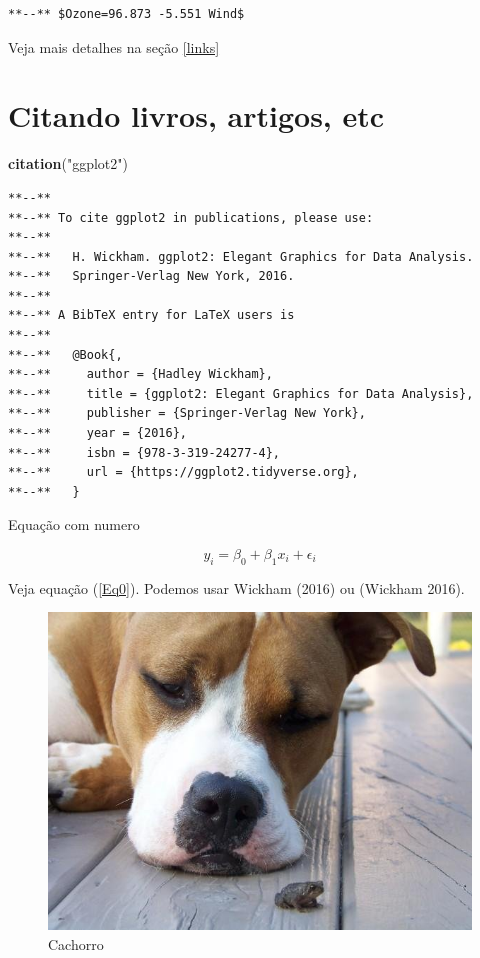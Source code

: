 \documentclass[12pt,brazil,]{article}
\newenvironment{Shaded}{\begin{snugshade}}{\end{snugshade}}
\newcommand{\KeywordTok}[1]{\textcolor[rgb]{0.26,0.66,0.93}{\textbf{#1}}}
\newcommand{\NormalTok}[1]{\textcolor[rgb]{0.74,0.68,0.62}{#1}}
\newcommand{\StringTok}[1]{\textcolor[rgb]{0.02,0.61,0.04}{#1}}
\begin{document}
\begin{verbatim}
**--** $Ozone=96.873 -5.551 Wind$
\end{verbatim}

Veja mais detalhes na seção \ref{links}

\hypertarget{citando-livros-artigos-etc}{%
\section{Citando livros, artigos,
etc}\label{citando-livros-artigos-etc}}

\begin{Shaded}
\begin{Highlighting}[]
\KeywordTok{citation}\NormalTok{(}\StringTok{"ggplot2"}\NormalTok{)}
\end{Highlighting}
\end{Shaded}

\begin{verbatim}
**--** 
**--** To cite ggplot2 in publications, please use:
**--** 
**--**   H. Wickham. ggplot2: Elegant Graphics for Data Analysis.
**--**   Springer-Verlag New York, 2016.
**--** 
**--** A BibTeX entry for LaTeX users is
**--** 
**--**   @Book{,
**--**     author = {Hadley Wickham},
**--**     title = {ggplot2: Elegant Graphics for Data Analysis},
**--**     publisher = {Springer-Verlag New York},
**--**     year = {2016},
**--**     isbn = {978-3-319-24277-4},
**--**     url = {https://ggplot2.tidyverse.org},
**--**   }
\end{verbatim}

Equação com numero

\begin{equation}
y_i=\beta_0 + \beta_1 x_i + \epsilon_i \label{Eq0}
\end{equation}

Veja equação (\ref{Eq0}). Podemos usar Wickham (2016) ou (Wickham 2016).

\begin{figure}

{\centering \includegraphics[width=0.5\linewidth]{cachorro} 

}

\caption{Cachorro}\label{fig:unnamed-chunk-11}
\end{figure}
\end{document}
